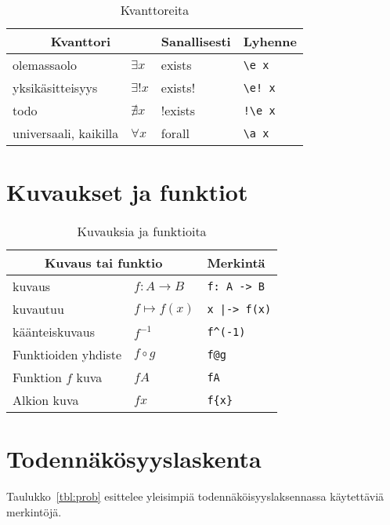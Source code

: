 \begin{table}[ht]
\begin{tabular}{ ll|l|l }
\multicolumn{2}{c}{Kvanttori} & Sanallisesti & Lyhenne \\ \hline
olemassaolo & $\exists x$ & exists & \verb$\e x$ \\
yksikäsitteisyys & $\exists! x$ & exists! & \verb$\e! x$ \\
todo & $\nexists x$ & !exists & \verb$!\e x$ \\
universaali, kaikilla & $\forall x$ & forall & \verb$\a x$ \\
\end{tabular}
\caption{Kvanttoreita}
\label{tbl:setq}
\end{table}

\FloatBarrier

\section{Kuvaukset ja funktiot}
\begin{table}[ht]
\begin{tabular}{ ll|l }
\multicolumn{2}{c}{Kuvaus tai funktio} & Merkintä \\ \hline
kuvaus & $f: A \rightarrow B$ & \verb$f: A -> B$ \\
kuvautuu & $f \mapsto f(x)$ & \verb$x |-> f(x)$ \\
käänteiskuvaus & $f^{-1}$ & \verb$f^(-1)$ \\
Funktioiden yhdiste & $f\circ g$ & \verb$f@g$ \\
Funktion $f$ kuva & $fA$ & \verb$fA$ \\
Alkion kuva & $f{x}$ & \verb$f{x}$ \\
\end{tabular}
\caption{Kuvauksia ja funktioita}
\label{tbl:func}
\end{table}

\section{Todennäkösyyslaskenta}
Taulukko~\ref{tbl:prob} esittelee yleisimpiä todennäköisyyslaksennassa käytettäviä merkintöjä.

